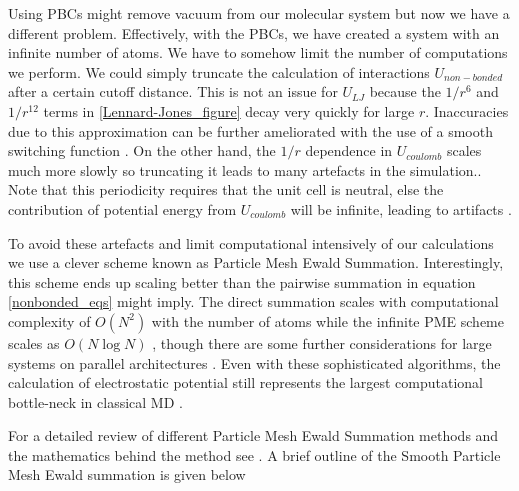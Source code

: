 Using PBCs might remove vacuum from our molecular system but now we have a different problem. Effectively, with the PBCs, we have created a system with an infinite number of atoms. We have to somehow limit the number of computations we perform. We could simply truncate the calculation of interactions $U_{non-bonded}$ after a certain cutoff distance. This is not an issue for $U_{LJ}$ because the $1/r^6$ and $1/r^{12}$ terms in \ref{Lennard-Jones_figure} decay very quickly for large $r$. Inaccuracies due to this approximation can be further ameliorated with the use of a smooth switching function \cite{klauda2007}\cite{venable2009}. On the other hand, the $1/r$ dependence in $U_{coulomb}$ scales much more slowly so truncating it leads to many artefacts in the simulation.\cite{auffinger1995}\cite{perera1995}\cite{roberts1994}\cite{delbuono1996}\cite{essmann1995}. Note that this periodicity requires that the unit cell is neutral, else the contribution of potential energy from $U_{coulomb}$ will be infinite, leading to artifacts \cite{hub2014}.

To avoid these artefacts and limit computational intensively of our calculations we use a clever scheme known as Particle Mesh Ewald Summation. Interestingly, this scheme ends up scaling better than the pairwise summation in equation \ref{nonbonded_eqs} might imply. The direct summation scales with computational complexity of $O(N^2)$  with the number of atoms while the infinite PME scheme scales as $O (N\log N)$ \cite{darden1993}, though there are some further considerations for large systems on parallel architectures \cite{hardy2015}. Even with these sophisticated algorithms, the calculation of electrostatic potential still represents the largest computational bottle-neck in classical MD \cite{hardy2015}.

For a detailed review of different Particle Mesh Ewald Summation methods and the mathematics behind the method see \cite{shan2005}. A brief outline of the Smooth Particle Mesh Ewald summation is given below 

